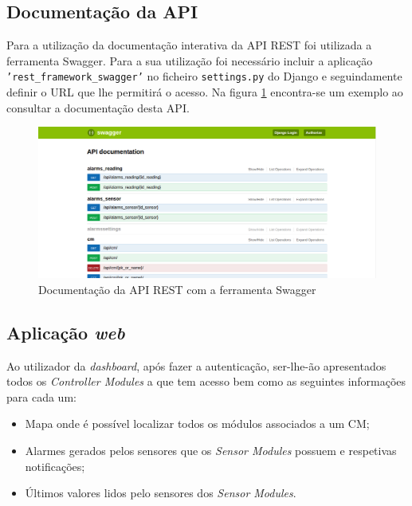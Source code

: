 \subsection{Documentação da API}

Para a utilização da documentação interativa da API REST foi utilizada a ferramenta Swagger. Para a sua utilização foi necessário incluir a aplicação \texttt{'rest\_framework\_swagger'} no ficheiro \texttt{settings.py} do Django e seguindamente definir o \ac{URL} que lhe permitirá o acesso. Na figura \ref{docapi} encontra-se um exemplo ao consultar a documentação desta API. 

\newpage

\begin{figure}[h]
	\centering
	\includegraphics[width=0.91\linewidth]{prints-web/api-doc.png}
	\caption{Documentação da API REST com a ferramenta Swagger}
	\label{docapi}
\end{figure}


\subsection{Aplicação \textit{web}}

Ao utilizador da \textit{dashboard}, após fazer a autenticação, ser-lhe-ão apresentados todos os \textit{Controller Modules} a que tem acesso bem como as seguintes informações para cada um:


\begin{itemize}
	\item Mapa onde é possível localizar todos os módulos associados a um \acl{CM}; 
	
	\item Alarmes gerados pelos sensores que os \textit{Sensor Modules} possuem e respetivas notificações; 
	
	\item Últimos valores lidos pelo sensores dos \textit{Sensor Modules}.
\end{itemize} 

